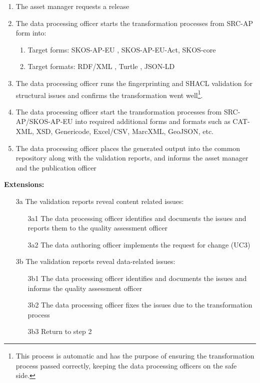 	\begin{enumerate}
		\item The asset manager requests a release
		\item The data processing officer starts the transformation processes from SRC-AP form into:
		\begin{enumerate}
			\item Target forms: SKOS-AP-EU \citep{skos-ap-eu}, SKOS-AP-EU-Act, SKOS-core \citep{skos-spec}
			\item Target formats: RDF/XML \citep{rdf-xml-Beckett:04:RSS} , Turtle \citep{turtle-Carothers:14:RT} , JSON-LD \citep{spornyjson}
		\end{enumerate}		
		\item The data processing officer runs the fingerprinting and SHACL validation for structural issues and confirms the transformation went well\footnote{This process is automatic and has the purpose of ensuring the transformation process passed correctly, keeping the data processing officers on the safe side.}.
		\item The data processing officer start the transformation processes from SRC-AP/SKOS-AP-EU into required additional forms and formats such as CAT-XML, XSD, Genericode, Excel/CSV, MarcXML, GeoJSON, etc.
		\item The data processing officer places the generated output into the common repository along with the validation reports, and informs the asset manager and the publication officer		
	\end{enumerate}
	
	\textbf{Extensions:}
	\begin{enumerate}
		\item [3a] The validation reports reveal content related issues:
		\begin{enumerate}
			\item [3a1] The data processing officer identifies and documents the issues and reports them to the quality assessment officer
			\item [3a2] The data authoring officer implements the request for change (UC3)
		\end{enumerate}

		\item [3b] The validation reports reveal data-related issues:
		\begin{enumerate}
			\item [3b1] The data processing officer identifies and documents the issues and informs the quality assessment officer
			\item [3b2] The data processing officer fixes the issues due to the transformation process
			\item [3b3] Return to step 2
		\end{enumerate}		
	\end{enumerate}
	

